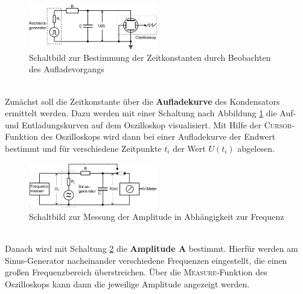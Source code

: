 \begin{figure}
	\includegraphics[width=0.5\textwidth]{Bild1.png}
	\centering
	\caption{Schaltbild zur Bestimmung der Zeitkonstanten durch Beobachten des Aufladevorgangs}
	\label{fig:Zeitkonstante}
\end{figure} \ \\
Zunächst soll die Zeitkonstante über die \textbf{Aufladekurve} des Kondensators ermittelt werden. Dazu werden mit einer Schaltung nach Abbildung \ref{fig:Zeitkonstante} die Auf- und Entladungskurven auf dem Oszilloskop visualisiert. Mit Hilfe der \textsc{Cursor}-Funktion des Oszilloskops wird dann bei einer Aufladekurve der Endwert bestimmt und für verschiedene Zeitpunkte $t_i$ der Wert $U(t_i)$ abgelesen. \\

\begin{figure}
	\includegraphics[width=0.5\textwidth]{Bild2.png}
	\centering
	\caption{Schaltbild zur Messung der Amplitude in Abhängigkeit zur Frequenz}
	\label{fig:Amplitude}
\end{figure} \ \\
Danach wird mit Schaltung \ref{fig:Amplitude} die \textbf{Amplitude $\bm{A}$} bestimmt. Hierfür werden am Sinus-Generator nacheinander verschiedene Frequenzen eingestellt, die einen großen Frequenzbereich überstreichen. Über die \textsc{Measure}-Funktion des Oszilloskops kann dann die jeweilige Amplitude angezeigt werden. \\

